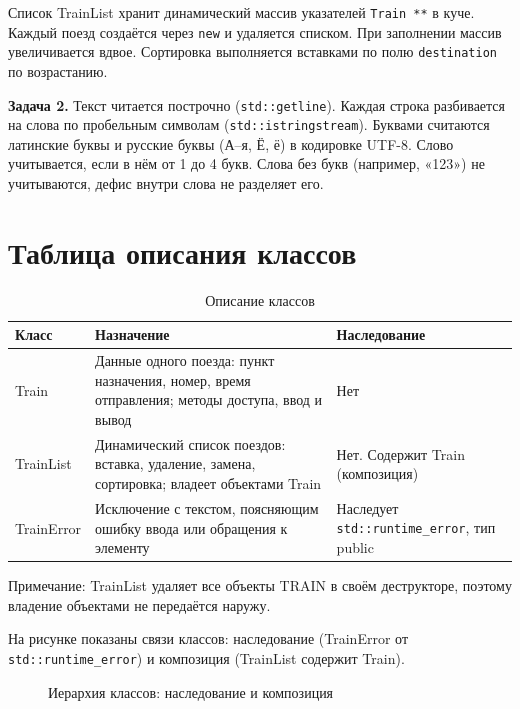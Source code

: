 \documentclass[
    oneside, %
    12pt %
]{article}
\begin{document}
Список TrainList хранит динамический массив указателей \texttt{Train **} в куче.
Каждый поезд создаётся через \texttt{new} и удаляется списком. При заполнении массив
увеличивается вдвое. Сортировка выполняется вставками по полю \texttt{destination}
по возрастанию.

\textbf{Задача 2.} Текст читается построчно (\texttt{std::getline}). Каждая строка
разбивается на слова по пробельным символам (\texttt{std::istringstream}). Буквами
считаются латинские буквы и русские буквы (А--я, Ё, ё) в кодировке UTF-8. Слово
учитывается, если в нём от 1 до 4 букв. Слова без букв (например, «123») не
учитываются, дефис внутри слова не разделяет его.

\section{Таблица описания классов}
\begin{table}[H]
    \caption{Описание классов}
    \begin{tabular}{|p{3.2cm}|p{6.8cm}|p{4.4cm}|}
        \hline
        Класс & Назначение & Наследование \\
        \hline
        Train & Данные одного поезда: пункт назначения, номер, время отправления;
        методы доступа, ввод и вывод & Нет \\
        \hline
        TrainList & Динамический список поездов: вставка, удаление, замена,
        сортировка; владеет объектами Train & Нет. Содержит Train (композиция) \\
        \hline
        TrainError & Исключение с текстом, поясняющим ошибку ввода или обращения
        к элементу & Наследует \texttt{std::runtime\_error}, тип public \\
        \hline
    \end{tabular}
    \par\smallskip
    Примечание: TrainList удаляет все объекты TRAIN в своём деструкторе, поэтому
    владение объектами не передаётся наружу.
\end{table}

На рисунке показаны связи классов: наследование (TrainError от
\texttt{std::runtime\_error}) и композиция (TrainList содержит Train).

\begin{figure}[H]
    \centering
    \caption{Иерархия классов: наследование и композиция}
\end{figure}
\end{document}
